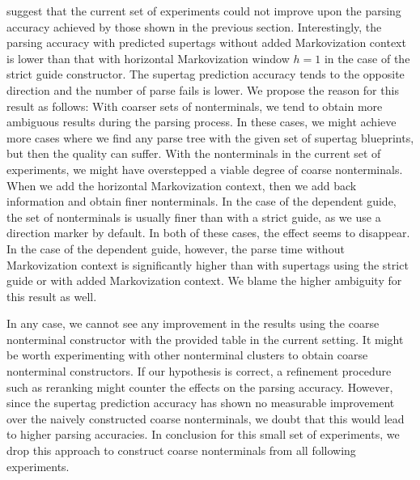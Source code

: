 \documentclass[../../document.tex]{subfiles}
\begin{document}
     suggest that the current set of experiments could not improve upon the parsing accuracy achieved by those shown in the previous section.
    Interestingly, the parsing accuracy with predicted supertags without added Markovization context is lower than that with horizontal Markovization window \(h=1\) in the case of the strict guide constructor. The supertag prediction accuracy tends to the opposite direction and the number of parse fails is lower.
    We propose the reason for this result as follows:
        With coarser sets of nonterminals, we tend to obtain more ambiguous results during the parsing process.
        In these cases, we might achieve more cases where we find any parse tree with the given set of supertag blueprints, but then the quality can suffer.
        With the nonterminals in the current set of experiments, we might have overstepped a viable degree of coarse nonterminals.
        When we add the horizontal Markovization context, then we add back information and obtain finer nonterminals.
        In the case of the dependent guide, the set of nonterminals is usually finer than with a strict guide, as we use a direction marker by default.
        In both of these cases, the effect seems to disappear.
    In the case of the dependent guide, however, the parse time without Markovization context is significantly higher than with supertags using the strict guide or with added Markovization context.
    We blame the higher ambiguity for this result as well.

    In any case, we cannot see any improvement in the results using the coarse nonterminal constructor with the provided table in the current setting.
    It might be worth experimenting with other nonterminal clusters to obtain coarse nonterminal constructors.
    If our hypothesis is correct, a refinement procedure such as reranking might counter the effects on the parsing accuracy.
    However, since the supertag prediction accuracy has shown no measurable improvement over the naively constructed coarse nonterminals, we doubt that this would lead to higher parsing accuracies.
    In conclusion for this small set of experiments, we drop this approach to construct coarse nonterminals from all following experiments.
\end{document}
